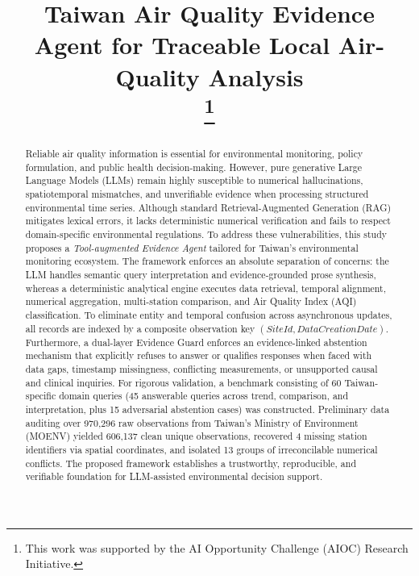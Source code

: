 \documentclass[conference]{IEEEtran}
\begin{document}
\title{Taiwan Air Quality Evidence Agent for Traceable Local Air-Quality Analysis\\
\thanks{This work was supported by the AI Opportunity Challenge (AIOC) Research Initiative.}
}

\author{
}

\maketitle

\begin{abstract}
Reliable air quality information is essential for environmental monitoring, policy formulation, and public health decision-making. However, pure generative Large Language Models (LLMs) remain highly susceptible to numerical hallucinations, spatiotemporal mismatches, and unverifiable evidence when processing structured environmental time series. Although standard Retrieval-Augmented Generation (RAG) mitigates lexical errors, it lacks deterministic numerical verification and fails to respect domain-specific environmental regulations. To address these vulnerabilities, this study proposes a \textit{Tool-augmented Evidence Agent} tailored for Taiwan's environmental monitoring ecosystem. The framework enforces an absolute separation of concerns: the LLM handles semantic query interpretation and evidence-grounded prose synthesis, whereas a deterministic analytical engine executes data retrieval, temporal alignment, numerical aggregation, multi-station comparison, and Air Quality Index (AQI) classification. To eliminate entity and temporal confusion across asynchronous updates, all records are indexed by a composite observation key $(SiteId, DataCreationDate)$. Furthermore, a dual-layer Evidence Guard enforces an evidence-linked abstention mechanism that explicitly refuses to answer or qualifies responses when faced with data gaps, timestamp missingness, conflicting measurements, or unsupported causal and clinical inquiries. For rigorous validation, a benchmark consisting of 60 Taiwan-specific domain queries (45 answerable queries across trend, comparison, and interpretation, plus 15 adversarial abstention cases) was constructed. Preliminary data auditing over 970,296 raw observations from Taiwan's Ministry of Environment (MOENV) yielded 606,137 clean unique observations, recovered 4 missing station identifiers via spatial coordinates, and isolated 13 groups of irreconcilable numerical conflicts. The proposed framework establishes a trustworthy, reproducible, and verifiable foundation for LLM-assisted environmental decision support.
\end{abstract}
\end{document}
